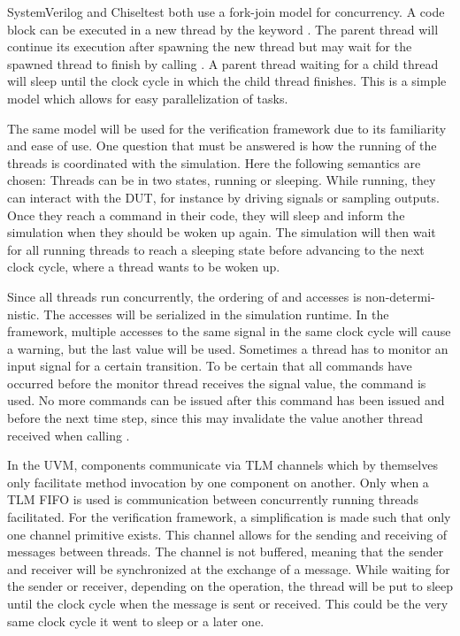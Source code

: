 SystemVerilog and Chiseltest both use a fork-join model for concurrency. A code block can be executed in a new thread
by the keyword . The parent thread will continue its execution after spawning the new thread but may wait
for the spawned thread to finish by calling . A parent thread waiting for a child thread will sleep until the clock cycle
in which the child thread finishes. This is a simple model which allows for easy parallelization of tasks.

The same model will be used for the verification framework due to its familiarity and ease of use. One question
that must be answered is how the running of the threads is coordinated with the simulation. Here the following
semantics are chosen: Threads can be in two states, running or sleeping. While running, they can interact with the
DUT, for instance by driving signals or sampling outputs. Once they reach a  command in their code, they
will sleep and inform the simulation when they should be woken up again. The simulation will then wait for all running
threads to reach a sleeping state before advancing to the next clock cycle, where a thread wants to be woken up.

Since all threads run concurrently, the ordering of  and  accesses is non-determi-nistic. The
accesses will be serialized in the simulation runtime. In the framework, multiple  accesses to the same signal in the same clock cycle will cause a
warning, but the last value will be used. Sometimes a thread has to monitor an input signal for a certain transition.
To be certain that all  commands have occurred before the monitor thread receives the signal value, the
 command is used. No more  commands can be issued after this command has been issued and before the next time
step, since this may invalidate the value another thread received when calling .

In the UVM, components communicate via TLM channels which by themselves only facilitate method invocation by
one component on another. Only when a TLM FIFO is used is communication between concurrently running threads
facilitated. For the verification framework, a simplification is made such that only one channel primitive exists. This
channel allows for the sending and receiving of messages between threads. The channel is not buffered, meaning that the
sender and receiver will be synchronized
at the exchange of a message. While waiting for the sender or receiver, depending on the operation, the thread will
be put to sleep until the clock cycle when the message is sent or received. This could be the very same clock cycle it
went to sleep or a later one.

